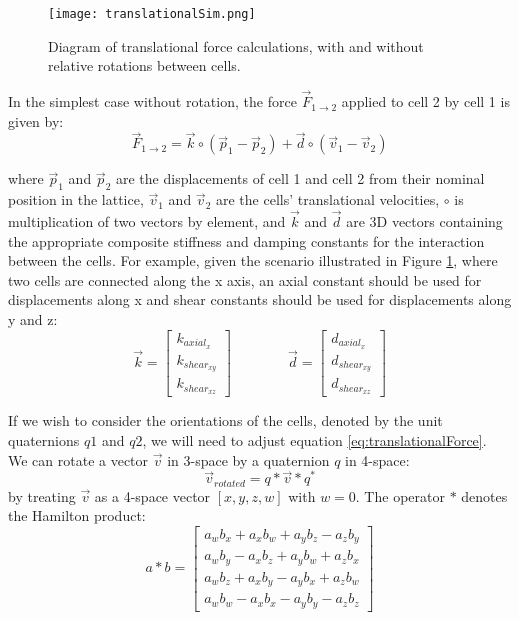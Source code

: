{\begin{figure}
  \texttt{[image: translationalSim.png]}
  \caption{Diagram of translational force calculations, with and without relative rotations between cells.}
  \label{fig:translationalSim}
\end{figure}

In the simplest case without rotation, the force $\vec{F}_{1 \rightarrow 2}$ applied to cell 2 by cell 1 is given by:
\begin{equation} \label{eq:translationalForce}
\vec{F}_{1\rightarrow2} = \vec{k} \circ (\vec{p}_1 - \vec{p}_2) + \vec{d} \circ (\vec{v}_1 - \vec{v}_2)
\end{equation}

where $\vec{p}_1$ and $\vec{p}_2$ are the displacements of cell 1 and cell 2 from their nominal position in the lattice, $\vec{v}_1$ and $\vec{v}_2$ are the cells' translational velocities, $\circ$ is multiplication of two vectors by element, and $\vec{k}$ and $\vec{d}$ are 3D vectors containing the appropriate composite stiffness and damping constants for the interaction between the cells.  For example, given the scenario illustrated in Figure \ref{fig:translationalSim}, where two cells are connected along the x axis, an axial constant should be used for displacements along x and shear constants should be used for displacements along y and z:
\[ \vec{k} =  \left[ \begin{array}{ccc}
k_{axial_x}\\
k_{shear_{xy}}\\
k_{shear_{xz}}
 \end{array} \right]  
  \qquad\qquad
  \vec{d} =  \left[ \begin{array}{ccc}
d_{axial_x}\\
d_{shear_{xy}}\\
d_{shear_{xz}}
 \end{array} \right] \] 
 
If we wish to consider the orientations of the cells, denoted by the unit quaternions $q1$ and $q2$, we will need to adjust equation \ref{eq:translationalForce}. \\
  
  We can rotate a vector $\vec{v}$ in 3-space by a quaternion $q$ in 4-space:
  \begin{equation}\label{eq:hamiltonprod}
  \vec{v}_{rotated} = q*\vec{v}*q^*
  \end{equation}
  by treating $\vec{v}$ as a 4-space vector $[x, y, z, w]$ with $w=0$.  The operator $*$ denotes the Hamilton product:
  \[ a*b =  \left[ \begin{array}{ccc}
a_wb_x + a_xb_w + a_yb_z - a_zb_y\\
a_wb_y - a_xb_z + a_yb_w + a_zb_x\\
a_wb_z + a_xb_y - a_yb_x + a_zb_w\\
a_wb_w - a_xb_x - a_yb_y - a_zb_z
 \end{array} \right] \] 
 
}
